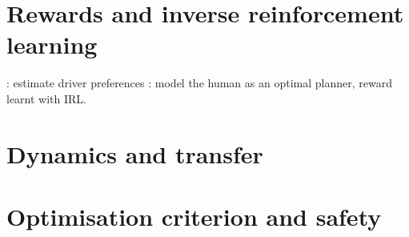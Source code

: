 \section{Rewards and inverse reinforcement learning}


\citep{Sun2019}: estimate driver preferences
\citep{Sadigh2016}: model the human as an optimal planner, reward learnt with IRL.

\section{Dynamics and transfer}
\section{Optimisation criterion and safety}
